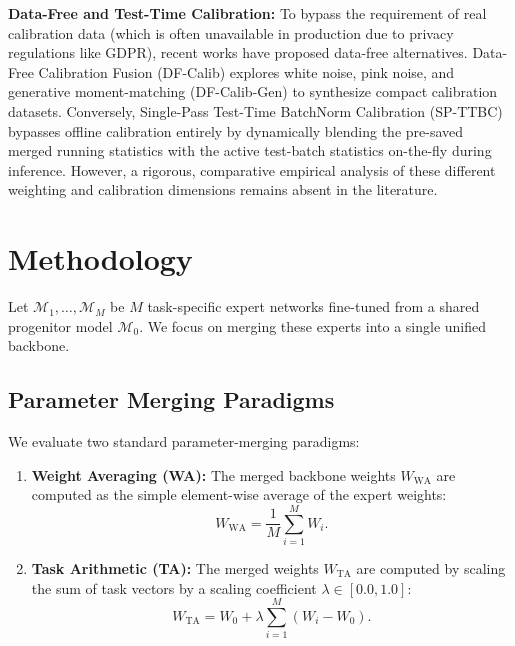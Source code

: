 \documentclass{article}
\theoremstyle{plain}
\theoremstyle{definition}
\theoremstyle{remark}
\begin{document}
\textbf{Data-Free and Test-Time Calibration:} To bypass the requirement of real calibration data (which is often unavailable in production due to privacy regulations like GDPR), recent works have proposed data-free alternatives. Data-Free Calibration Fusion (DF-Calib) \cite{s10_dfcalib} explores white noise, pink noise, and generative moment-matching (DF-Calib-Gen) to synthesize compact calibration datasets. Conversely, Single-Pass Test-Time BatchNorm Calibration (SP-TTBC) \cite{s5_spttbc} bypasses offline calibration entirely by dynamically blending the pre-saved merged running statistics with the active test-batch statistics on-the-fly during inference. However, a rigorous, comparative empirical analysis of these different weighting and calibration dimensions remains absent in the literature.

\section{Methodology}
\label{sec:method}
Let $\mathcal{M}_1, \dots, \mathcal{M}_M$ be $M$ task-specific expert networks fine-tuned from a shared progenitor model $\mathcal{M}_0$. We focus on merging these experts into a single unified backbone.

\subsection{Parameter Merging Paradigms}
We evaluate two standard parameter-merging paradigms:
\begin{enumerate}
    \item \textbf{Weight Averaging (WA):} The merged backbone weights $W_{\text{WA}}$ are computed as the simple element-wise average of the expert weights:
    \begin{equation}
        W_{\text{WA}} = \frac{1}{M} \sum_{i=1}^M W_i.
    \end{equation}
    \item \textbf{Task Arithmetic (TA):} The merged weights $W_{\text{TA}}$ are computed by scaling the sum of task vectors by a scaling coefficient $\lambda \in [0.0, 1.0]$:
    \begin{equation}
        W_{\text{TA}} = W_0 + \lambda \sum_{i=1}^M (W_i - W_0).
    \end{equation}
\end{enumerate}
\end{document}
